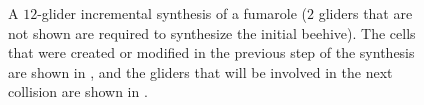\begin{figure}[!htb]
	\centering{}
	\caption{A $12$-glider incremental synthesis of a fumarole ($2$ gliders that are not shown are required to synthesize the initial beehive). The cells that were created or modified in the previous step of the synthesis are shown in , and the gliders that will be involved in the next collision are shown in .}\label{fig:fumarole_sequential}
\end{figure}

